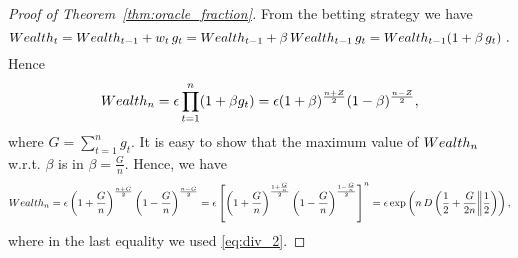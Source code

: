 \begin{proof}[Proof of Theorem~\ref{thm:oracle_fraction}]
From the betting strategy we have
\[
Wealth_t=Wealth_{t-1} + w_t \, g_t = Wealth_{t-1} + \beta \, Wealth_{t-1} \, g_t = Wealth_{t-1} (1+\beta \, g_t)~.
\]
Hence
\[
Wealth_n=\epsilon \prod_{t=1}^n (1+\beta g_t) = \epsilon (1+\beta)^\frac{n+Z}{2} (1-\beta)^\frac{n-Z}{2},
\]
where $G=\sum_{t=1}^n g_t$.
It is easy to show that the maximum value of $Wealth_n$ w.r.t. $\beta$ is in $\beta=\frac{G}{n}$. 
Hence, we have
\[
Wealth_n = \epsilon \left(1+\frac{G}{n}\right)^\frac{n+G}{2} \left(1-\frac{G}{n}\right)^\frac{n-G}{2} 
= \epsilon \left[\left(1+\frac{G}{n}\right)^\frac{1+\frac{G}{n}}{2} \left(1-\frac{G}{n}\right)^\frac{1-\frac{G}{n}}{2}\right]^n 
= \epsilon \exp\left( n \, D\left(\frac{1}{2}+\frac{G}{2n}\middle\|\frac{1}{2}\right) \right),
\]
where in the last equality we used \eqref{eq:div_2}.
\end{proof}


